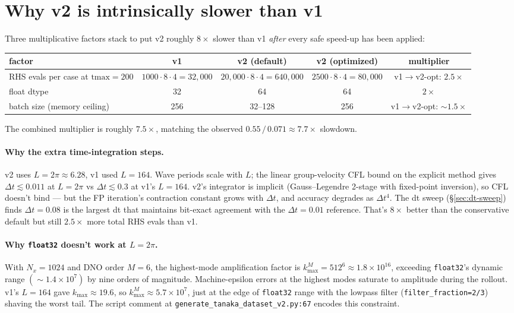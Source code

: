 \documentclass[11pt]{article}
\begin{document}
\section{Why v2 is intrinsically slower than v1}
\label{sec:constraints}

Three multiplicative factors stack to put v2 roughly $8\times$ slower than v1
\emph{after} every safe speed-up has been applied:

\begin{center}
\begin{tabular}{lcccc}
\toprule
factor & v1 & v2 (default) & v2 (optimized) & multiplier \\
\midrule
RHS evals per case at $\text{tmax}=200$ &
  $1000\!\cdot\!8\!\cdot\!4 = 32{,}000$ &
  $20{,}000\!\cdot\!8\!\cdot\!4 = 640{,}000$ &
  $2500\!\cdot\!8\!\cdot\!4 = 80{,}000$ &
  v1$\to$v2-opt: $2.5\times$ \\[2pt]
float dtype & 32 & 64 & 64 & $2\times$ \\[2pt]
batch size (memory ceiling) & 256 & 32--128 & 256 & v1$\to$v2-opt: $\sim\!1.5\times$ \\
\bottomrule
\end{tabular}
\end{center}

The combined multiplier is roughly $7.5\times$, matching the observed
$0.55\,/\,0.071 \approx 7.7\times$ slowdown.

\paragraph{Why the extra time-integration steps.} v2 uses $L=2\pi\approx 6.28$, v1 used
$L=164$. Wave periods scale with $L$; the linear group-velocity CFL bound on the
explicit method gives $\Delta t \lesssim 0.011$ at $L=2\pi$ vs $\Delta t \lesssim 0.3$
at v1's $L=164$. v2's integrator is implicit (Gauss--Legendre 2-stage with
fixed-point inversion), so CFL doesn't bind --- but the FP iteration's contraction
constant grows with $\Delta t$, and accuracy degrades as $\Delta t^4$. The dt sweep
(\S\ref{sec:dt-sweep}) finds $\Delta t = 0.08$ is the largest dt that maintains
bit-exact agreement with the $\Delta t=0.01$ reference. That's $8\times$ better than
the conservative default but still $2.5\times$ more total RHS evals than v1.

\paragraph{Why \texttt{float32} doesn't work at $L=2\pi$.} With $N_x=1024$ and DNO
order $M=6$, the highest-mode amplification factor is $k_{\max}^M = 512^6 \approx
1.8\!\times\!10^{16}$, exceeding \texttt{float32}'s dynamic range
$(\sim\!1.4\!\times\!10^7)$ by nine orders of magnitude. Machine-epsilon errors at
the highest modes saturate to amplitude during the rollout. v1's $L=164$ gave
$k_{\max} \approx 19.6$, so $k_{\max}^M \approx 5.7\!\times\!10^7$, just at the edge
of \texttt{float32} range with the lowpass filter (\texttt{filter\_fraction=2/3})
shaving the worst tail. The script comment at
\texttt{generate\_tanaka\_dataset\_v2.py:67} encodes this constraint.
\end{document}
